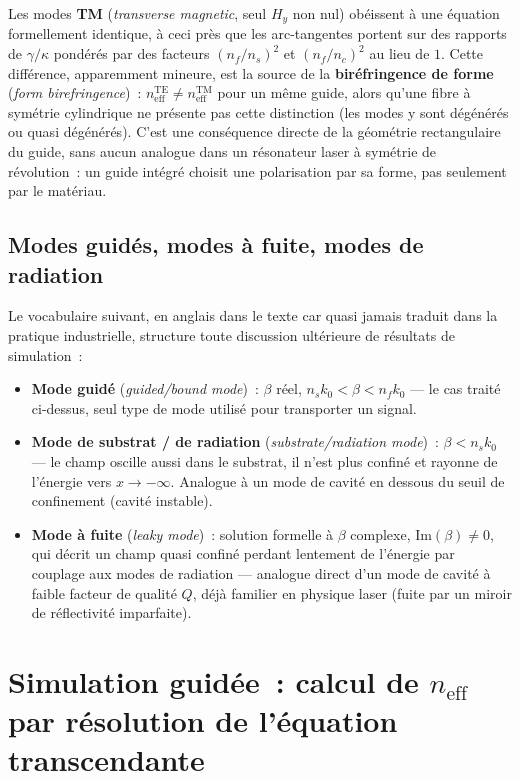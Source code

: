 Les modes \textbf{TM} (\emph{transverse magnetic}, seul $H_y$ non nul)
obéissent à une équation formellement identique, à ceci près que les
arc-tangentes portent sur des rapports de $\gamma/\kappa$ pondérés par des
facteurs $(n_f/n_s)^2$ et $(n_f/n_c)^2$ au lieu de $1$. Cette différence,
apparemment mineure, est la source de la \textbf{biréfringence de forme}
(\emph{form birefringence})~: $n_{\text{eff}}^{\text{TE}} \neq
n_{\text{eff}}^{\text{TM}}$ pour un même guide, alors qu'une fibre à
symétrie cylindrique ne présente pas cette distinction (les modes y sont
dégénérés ou quasi dégénérés). C'est une conséquence directe de la
géométrie rectangulaire du guide, sans aucun analogue dans un résonateur
laser à symétrie de révolution~: un guide intégré \og choisit\fg{} une
polarisation par sa forme, pas seulement par le matériau.

\subsection{Modes guidés, modes à fuite, modes de radiation}

Le vocabulaire suivant, en anglais dans le texte car quasi jamais traduit
dans la pratique industrielle, structure toute discussion ultérieure de
résultats de simulation~:
\begin{itemize}[leftmargin=1.4em]
  \item \textbf{Mode guidé} (\emph{guided/bound mode})~: $\beta$ réel,
    $n_s k_0 < \beta < n_f k_0$ — le cas traité ci-dessus, seul type de mode
    utilisé pour transporter un signal.
  \item \textbf{Mode de substrat / de radiation} (\emph{substrate/radiation
    mode})~: $\beta < n_s k_0$ — le champ oscille aussi dans le substrat, il
    n'est plus confiné et rayonne de l'énergie vers $x \to -\infty$.
    Analogue à un mode de cavité en dessous du seuil de confinement
    (cavité \og instable\fg{}).
  \item \textbf{Mode à fuite} (\emph{leaky mode})~: solution formelle à
    $\beta$ complexe, $\mathrm{Im}(\beta) \neq 0$, qui décrit un champ
    quasi confiné perdant lentement de l'énergie par couplage aux modes de
    radiation — analogue direct d'un mode de cavité à faible facteur de
    qualité $Q$, déjà familier en physique laser (fuite par un miroir de
    réflectivité imparfaite).
\end{itemize}

\section{Simulation guidée~: calcul de $n_{\text{eff}}$ par résolution de l'équation transcendante}

